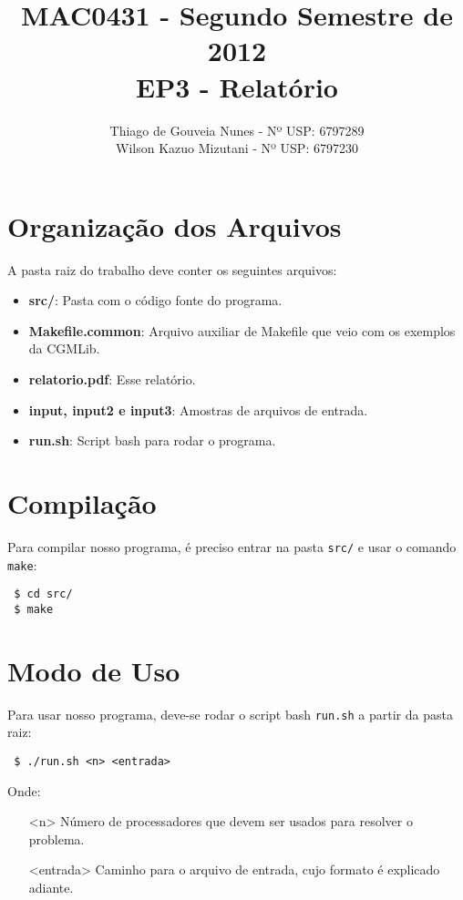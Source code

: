 \documentclass[a4paper,11pt]{article}
\title{MAC0431 - Segundo Semestre de 2012 \\
       EP3 - Relatório}
\author{Thiago de Gouveia Nunes - Nº USP: 6797289 \\
        Wilson Kazuo Mizutani - Nº USP: 6797230}
\begin{document}
\maketitle

\section{Organização dos Arquivos}

  A pasta raiz do trabalho deve conter os seguintes arquivos:
  
  \hspace{50pt}
  \begin{itemize}
    \item \textbf{src/}:
      Pasta com o código fonte do programa.
    \item \textbf{Makefile.common}:
      Arquivo auxiliar de Makefile que veio com os exemplos da CGMLib.
    \item \textbf{relatorio.pdf}:
      Esse relatório.
    \item \textbf{input, input2 e input3}:
      Amostras de arquivos de entrada.
    \item \textbf{run.sh}:
      Script bash para rodar o programa.
  \end{itemize}

\section{Compilação}

  Para compilar nosso programa, é preciso entrar na pasta \verb$src/$ e usar o
  comando \verb$make$:

  \begin{verbatim} $ cd src/
 $ make \end{verbatim}

\section{Modo de Uso}

  Para usar nosso programa, deve-se rodar o script bash \verb$run.sh$ a partir da pasta
  raiz:
  
  \begin{verbatim} $ ./run.sh <n> <entrada> \end{verbatim}
  
  Onde:
  
  \begin{itemize}
    \item[<n>]
      Número de processadores que devem ser usados para resolver o problema.
    \item[<entrada>]
      Caminho para o arquivo de entrada, cujo formato é explicado adiante.
  \end{itemize}
 
\end{document}
